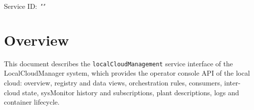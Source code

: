 \documentclass[a4paper]{arrowhead}
\begin{document}
\sloppy

\ArrowheadSetup

\begin{center}
  \vspace*{1cm}
  \huge{\arrowtitle}

  \vspace*{0.2cm}
  \LARGE{\arrowtype}
  \vspace*{1cm}

  \Large{Service ID: \textit{"\arrowid"}}

  \vspace*{\fill}


  \vspace*{1cm}
  \vspace*{\fill}

  \begin{abstract}
    This document describes the HTTP/1.1 protocol with TLS payload security and JSON payload encoding variant of the \texttt{local\allowbreak{}Cloud\allowbreak{}Management} service of the LocalCloudManager system.
  \end{abstract}

  \vspace*{1cm}
\end{center}

\newpage

\tableofcontents
\newpage

\section{Overview}
\label{sec:overview}

This document describes the \texttt{local\allowbreak{}Cloud\allowbreak{}Management} service interface of the LocalCloudManager system, which provides the operator console API of the local cloud: overview, registry and data views, orchestration rules, consumers, inter-cloud state, sysMonitor history and subscriptions, plant descriptions, logs and container lifecycle.
\end{document}
